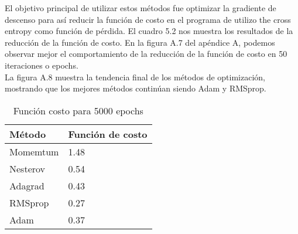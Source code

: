 El objetivo principal de utilizar estos métodos fue optimizar la gradiente de descenso para así reducir la función de costo en el programa de utilizo the cross entropy como función de pérdida.
El cuadro 5.2 nos muestra los resultados de la reducción de la función de costo. En la figura A.7 del apéndice A, podemos observar mejor el comportamiento de la reducción de la función de costo en 50 iteraciones o epochs.\\
La figura A.8 muestra la tendencia final de los métodos de optimización, mostrando que los mejores métodos continúan siendo Adam y RMSprop. 
\begin{table}[H]
	\centering
	\caption{Función costo para 5000 epochs}
	\label{my-label}
	\begin{centering}
		\begin{tabular}{@{}ll@{}}
			\toprule
			Método& Función de costo\\ \midrule
			Momemtum& 1.48 \\
			Nesterov& 0.54 \\
			Adagrad&0.43   \\
			RMSprop& 0.27 \\
			Adam& 0.37 \\ \bottomrule
		\end{tabular}
	\end{centering}
	
\end{table}

